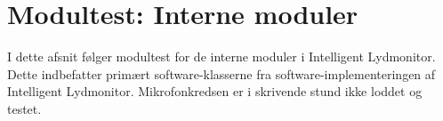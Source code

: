 \section{Modultest: Interne moduler}

I dette afsnit følger modultest for de interne moduler i Intelligent Lydmonitor. Dette indbefatter primært software-klasserne fra software-implementeringen af Intelligent Lydmonitor. Mikrofonkredsen er i skrivende stund ikke loddet og testet.









